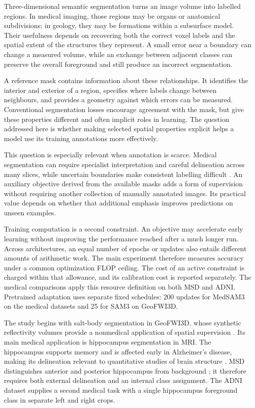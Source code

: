 \documentclass[12pt,a4paper]{article}
\begin{document}
Three-dimensional semantic segmentation turns an image volume into labelled
regions. In medical imaging, those regions may be organs or anatomical
subdivisions; in geology, they may be formations within a subsurface model.
Their usefulness depends on recovering both the correct voxel labels and
the spatial extent of the structures they represent. A small error near a
boundary can change a measured volume, while an exchange between adjacent
classes can preserve the overall foreground and still produce an incorrect
segmentation.

A reference mask contains information about these relationships. It
identifies the interior and exterior of a region, specifies where labels
change between neighbours, and provides a geometry against which errors
can be measured. Conventional segmentation losses encourage agreement
with the mask, but give these properties different and often implicit
roles in learning. The question addressed here is whether making selected
spatial properties explicit helps a model use its training annotations
more effectively.

This question is especially relevant when annotation is scarce. Medical
segmentation can require specialist interpretation and careful delineation
across many slices, while uncertain boundaries make consistent labelling
difficult \cite{wang2021annotation}. An auxiliary objective derived from
the available masks adds a form of supervision without requiring another
collection of manually annotated images. Its practical value depends on
whether that additional emphasis improves predictions on unseen examples.

Training computation is a second constraint. An objective may accelerate
early learning without improving the performance reached after a much
longer run. Across architectures, an equal number of epochs or updates
also entails different amounts of arithmetic work. The main experiment
therefore measures accuracy under a common optimization FLOP ceiling.
The cost of an active constraint is charged within that allowance, and
its calibration cost is reported separately. The medical comparisons apply this resource definition on both MSD
and ADNI. Pretrained adaptation uses separate fixed schedules: 200 updates
for MedSAM3 on the medical datasets and 25 for SAM3 on GeoFWI3D.

The study begins with salt-body segmentation in GeoFWI3D, whose synthetic
reflectivity volumes provide a nonmedical application of spatial
supervision \cite{swaminadhan2026geofwi3d}. Its main medical application
is hippocampus segmentation in MRI. The hippocampus supports memory and
is affected early in Alzheimer's disease, making its delineation relevant
to quantitative studies of brain structure \cite{niaAlzheimerBrain}.
MSD distinguishes anterior and posterior hippocampus from background
\cite{simpson2019dataset}; it therefore requires both external delineation
and an internal class assignment. The ADNI dataset supplies
a second medical task with a single hippocampus foreground class in
separate left and right crops.
\end{document}
